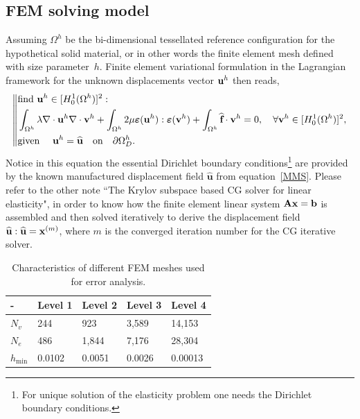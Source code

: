 \documentclass{report}
\newcommand{\bA}{\textbf{A}}
\newcommand{\bx}{\textbf{x}}
\newcommand{\bb}{\textbf{b}}
\newcommand{\bu}{\textbf{u}}
\newcommand{\bv}{\textbf{v}}
\newcommand{\wbu}{\widehat{\textbf{u}}}
\newcommand{\bff}{\textbf{f}}
\def\bA{{{\bf{A}}}}
\def\bb{{\bf{b}}}
\def\bx{{\bf{x}}}
\def\bu{{\bf{u}}}
\def\bv{{\bf{v}}}
\begin{document}
\subsection{FEM solving model}
Assuming $\Omega^h$ be the bi-dimensional tessellated reference configuration for the hypothetical solid material, or in other words the finite element mesh defined with size parameter~$h$. Finite element variational formulation in the Lagrangian framework for the unknown displacements vector $\bu^h$ then reads, 
	\begin{equation}\label{varf}
	\left\|\begin{aligned}
	&\text{find}~\bu^h\in[H^1_0(\Omega^h)]^2:\\
	&\int_{\Omega^h}\lambda\nabla\cdot\bu^h\nabla\cdot\bv^h + \int_{\Omega^h}2\mu\boldsymbol\varepsilon(\bu^h):\boldsymbol\varepsilon(\bv^h)+\int_{\Omega^h}\widehat{\bff}\cdot\bv^h=0, \quad\forall\bv^h\in[H^1_0(\Omega^h)]^2,\\
	&\text{given}~\quad\bu^h=\wbu\quad\text{on}\quad\partial\Omega^h_D.
	\end{aligned}\right.
	\end{equation}
Notice in this equation the essential Dirichlet boundary conditions\footnote{For unique solution of the elasticity problem one needs the Dirichlet boundary conditions.} are provided by the known manufactured displacement field $\wbu$ from equation~\eqref{MMS}. Please refer to the other note ``The Krylov subspace based CG solver for linear elasticity", in order to know how the finite element linear system $\bA\bx=\bb$ is assembled and then solved iteratively to derive the displacement field $\wbu: \wbu=\bx^{(m)}$, where $m$ is the converged iteration number for the CG iterative solver. 
	
\begin{table}[htbp]
		\centering
		\begin{tabular}{p{} p{}p{}p{}p{} }
			\hline
			 - & Level 1 & Level 2 & Level 3 & Level 4	\\ \hline
			$N_v$ & 244 & 923 & 3,589 & 14,153  \\ 
			$N_e$ & 486 & 1,844 & 7,176  & 28,304  \\ 
			$h_{\text{min}}$ & 0.0102 & 0.0051 & 0.0026 & 0.00013 \\ 
			\hline
		\end{tabular}
\caption{Characteristics of different FEM meshes used for error analysis.
} \label{tab:meshes}
\end{table}	
\end{document}
